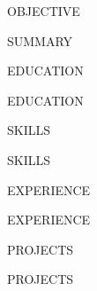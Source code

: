 \documentclass{resume}
\begin{document}

\begin{rSection}{OBJECTIVE}

{{SUMMARY}}

\end{rSection}


\begin{rSection}{EDUCATION}

{{EDUCATION}}

\end{rSection}


\begin{rSection}{SKILLS}

{{SKILLS}}

\end{rSection}


\begin{rSection}{EXPERIENCE}

{{EXPERIENCE}}

\end{rSection}


\begin{rSection}{PROJECTS}

{{PROJECTS}}

\end{rSection}
\end{document}
